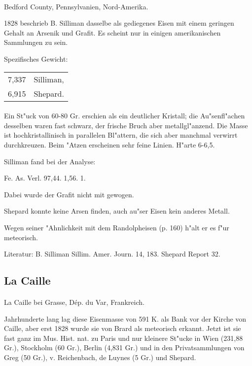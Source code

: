 \documentclass[a4paper, 11pt, oneside]{article}
\begin{document}
\paragraph{}
Bedford County, Pennsylvanien, Nord-Amerika.

1828 beschrieb B. Silliman dasselbe als gediegenes Eisen mit einem geringen Gehalt an Arsenik und Grafit. Es scheint nur in einigen amerikanischen Sammlungen zu sein.

Spezifisches Gewicht:  
\begin{table}[!ht]
    \centering
    \begin{tabular}{l l}
        7,337 & Silliman,\\
        6,915 & Shepard.
    \end{tabular}
\end{table}
\paragraph{}
Ein St"uck von 60-80 Gr. erschien als ein deutlicher Kristall; die Au"senfl"achen desselben waren fast schwarz, der frische Bruch aber metallgl"anzend. Die Masse ist hochkristallinisch in parallelen Bl"attern, die sich aber manchmal verwirrt durchkreuzen. Beim "Atzen erscheinen sehr feine Linien. H"arte 6-6,5.

Silliman fand bei der Analyse:

Fe. As. Verl.  
97,44. 1,56. 1.

Dabei wurde der Grafit nicht mit gewogen.

Shepard konnte keine Arsen finden, auch au"ser Eisen kein anderes Metall.

Wegen seiner "Ahnlichkeit mit dem Randolpheisen (p. 160) h"alt er es f"ur meteorisch.

Literatur: B. Silliman Sillim. Amer. Journ. 14, 183. Shepard Report 32.

\subsection{La Caille}
\normalsize
\paragraph{}
La Caille bei Grasse, Dép. du Var, Frankreich.

Jahrhunderte lang lag diese Eisenmasse von 591 K. als Bank vor der Kirche von Caille, aber erst 1828 wurde sie von Brard als meteorisch erkannt. Jetzt ist sie fast ganz im Mus. Hist. nat. zu Paris und nur kleinere St"ucke in Wien (231,88 Gr.), Stockholm (60 Gr.), Berlin (4,831 Gr.) und in den Privatsammlungen von Greg (50 Gr.), v. Reichenbach, de Luynes (5 Gr.) und Shepard.
\end{document}
